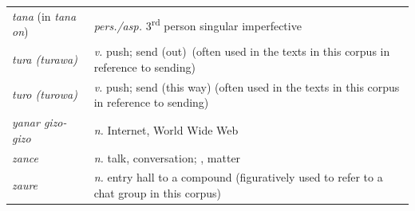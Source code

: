 \documentclass[output=paper
,newtxmath
,modfonts
,nonflat]{langsci/langscibook}
\begin{document}
\begin{tabularx}{\textwidth}{p{3cm}Q}
\textit{tana} (in \textit{tana on}) & \textit{pers./asp.} 3\textsuperscript{rd} person singular  imperfective\\
\textit{tura (turawa)} & \textit{v.} push; send (out)~(often used in the texts in this corpus in reference to sending)\\
\textit{turo (turowa)} & \textit{v.} push; send (this way) (often used in the texts in this corpus in reference to sending)\\
\textit{yanar gizo-gizo} & \textit{n.} Internet, World Wide Web \\
\textit{zance} & \textit{n.} talk, conversation; , matter \\
\textit{zaure} & \textit{n.} entry hall to a compound (figuratively used to refer to a chat group in this corpus)\\
\end{tabularx}


\sloppy
\printbibliography[heading=subbibliography,notkeyword=this]
\end{document}
